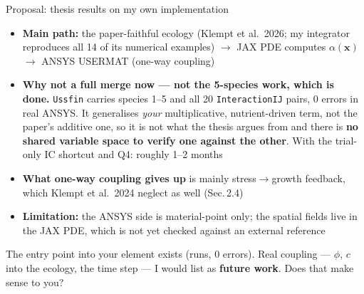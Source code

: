 \documentclass[aspectratio=169,11pt]{beamer}
\begin{document}
\begin{frame}{Proposal: thesis results on my own implementation}
\small
\begin{itemize}
  \item \textbf{Main path:} the paper-faithful ecology (Klempt et al.\ 2026;
        my integrator reproduces all 14 of its numerical examples) $\to$
        JAX PDE computes $\alpha(\mathbf x)$ $\to$ ANSYS USERMAT
        (one-way coupling)
  \item \textbf{Why not a full merge now --- not the 5-species work, which is
        done.} \texttt{Ussfin} carries species 1--5 and all 20
        \texttt{InteractionIJ} pairs, 0 errors in real ANSYS. It generalises
        \emph{your} multiplicative, nutrient-driven term, not the paper's
        additive one, so it is not what the thesis argues from and there is
        \textbf{no shared variable space to verify one against the other}.
        With the trial-only IC shortcut and Q4: roughly 1--2 months
  \item \textbf{What one-way coupling gives up} is mainly stress$\to$growth
        feedback, which Klempt et al.\ 2024 neglect as well (Sec.\,2.4)
  \item \textbf{Limitation:} the ANSYS side is material-point only; the
        spatial fields live in the JAX PDE, which is not yet checked against
        an external reference
\end{itemize}
\vspace{4pt}
\begin{center}
\colorbox{c3!12}{\parbox{0.88\linewidth}{\centering\small
The entry point into your element exists (runs, 0 errors). Real coupling ---
$\phi$, $c$ into the ecology, the time step --- I would list as
\textbf{future work}. Does that make sense to you?}}
\end{center}
\end{frame}
\end{document}
